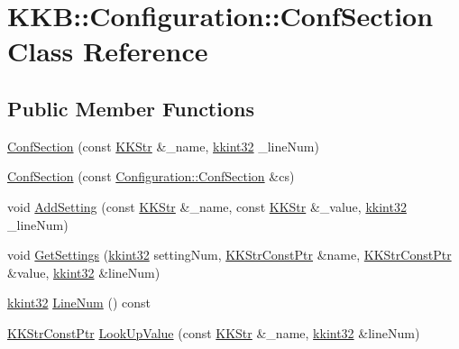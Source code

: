 \hypertarget{class_k_k_b_1_1_configuration_1_1_conf_section}{}\section{K\+KB\+:\+:Configuration\+:\+:Conf\+Section Class Reference}
\label{class_k_k_b_1_1_configuration_1_1_conf_section}
\subsection*{Public Member Functions}
\begin{DoxyCompactItemize}
\item 
\hyperlink{class_k_k_b_1_1_configuration_1_1_conf_section_af36f42567984996486b9efa6c12f6c62}{Conf\+Section} (const \hyperlink{class_k_k_b_1_1_k_k_str}{K\+K\+Str} \&\+\_\+name, \hyperlink{namespace_k_k_b_a8fa4952cc84fda1de4bec1fbdd8d5b1b}{kkint32} \+\_\+line\+Num)
\item 
\hyperlink{class_k_k_b_1_1_configuration_1_1_conf_section_a7a3ab7d3a314121d60a761c350673c5e}{Conf\+Section} (const \hyperlink{class_k_k_b_1_1_configuration_1_1_conf_section}{Configuration\+::\+Conf\+Section} \&cs)
\item 
void \hyperlink{class_k_k_b_1_1_configuration_1_1_conf_section_ab3dd85e5960eb392f0c6619f6b4f5f1c}{Add\+Setting} (const \hyperlink{class_k_k_b_1_1_k_k_str}{K\+K\+Str} \&\+\_\+name, const \hyperlink{class_k_k_b_1_1_k_k_str}{K\+K\+Str} \&\+\_\+value, \hyperlink{namespace_k_k_b_a8fa4952cc84fda1de4bec1fbdd8d5b1b}{kkint32} \+\_\+line\+Num)
\item 
void \hyperlink{class_k_k_b_1_1_configuration_1_1_conf_section_ac5d802d610306415ad426e48766f0e36}{Get\+Settings} (\hyperlink{namespace_k_k_b_a8fa4952cc84fda1de4bec1fbdd8d5b1b}{kkint32} setting\+Num, \hyperlink{namespace_k_k_b_a46f665ec17615c856eff3d21f78bed5c}{K\+K\+Str\+Const\+Ptr} \&name, \hyperlink{namespace_k_k_b_a46f665ec17615c856eff3d21f78bed5c}{K\+K\+Str\+Const\+Ptr} \&value, \hyperlink{namespace_k_k_b_a8fa4952cc84fda1de4bec1fbdd8d5b1b}{kkint32} \&line\+Num)
\item 
\hyperlink{namespace_k_k_b_a8fa4952cc84fda1de4bec1fbdd8d5b1b}{kkint32} \hyperlink{class_k_k_b_1_1_configuration_1_1_conf_section_a44053487042a86c46e42b4cbf364578a}{Line\+Num} () const 
\item 
\hyperlink{namespace_k_k_b_a46f665ec17615c856eff3d21f78bed5c}{K\+K\+Str\+Const\+Ptr} \hyperlink{class_k_k_b_1_1_configuration_1_1_conf_section_ab8f32ef5e35d2dca8609ae4f3a040108}{Look\+Up\+Value} (const \hyperlink{class_k_k_b_1_1_k_k_str}{K\+K\+Str} \&\+\_\+name, \hyperlink{namespace_k_k_b_a8fa4952cc84fda1de4bec1fbdd8d5b1b}{kkint32} \&line\+Num)

\end{DoxyCompactItemize}
